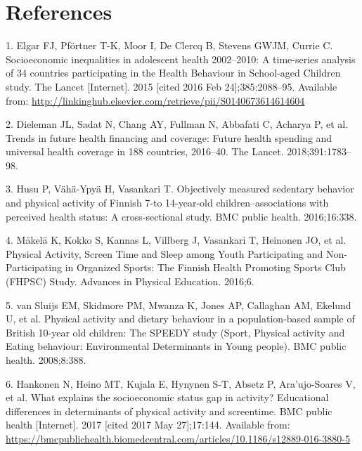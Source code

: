 \documentclass[english,man,floatsintext]{apa6}
\begin{document}
\newpage

\hypertarget{references}{%
\section{References}\label{references}}

\begingroup
\setlength{\parindent}{-0.5in}
\setlength{\leftskip}{0.5in}

\hypertarget{refs}{}
\leavevmode\hypertarget{ref-elgarSocioeconomicInequalitiesAdolescent2015}{}%
1. Elgar FJ, Pförtner T-K, Moor I, De Clercq B, Stevens GWJM, Currie C. Socioeconomic inequalities in adolescent health 2002--2010: A time-series analysis of 34 countries participating in the Health Behaviour in School-aged Children study. The Lancet {[}Internet{]}. 2015 {[}cited 2016 Feb 24{]};385:2088--95. Available from: \url{http://linkinghub.elsevier.com/retrieve/pii/S0140673614614604}

\leavevmode\hypertarget{ref-dielemanTrendsFutureHealth2018}{}%
2. Dieleman JL, Sadat N, Chang AY, Fullman N, Abbafati C, Acharya P, et al. Trends in future health financing and coverage: Future health spending and universal health coverage in 188 countries, 2016--40. The Lancet. 2018;391:1783--98.

\leavevmode\hypertarget{ref-husuObjectivelyMeasuredSedentary2016}{}%
3. Husu P, Vähä-Ypyä H, Vasankari T. Objectively measured sedentary behavior and physical activity of Finnish 7-to 14-year-old children--associations with perceived health status: A cross-sectional study. BMC public health. 2016;16:338.

\leavevmode\hypertarget{ref-makelaPhysicalActivityScreen2016}{}%
4. Mäkelä K, Kokko S, Kannas L, Villberg J, Vasankari T, Heinonen JO, et al. Physical Activity, Screen Time and Sleep among Youth Participating and Non-Participating in Organized Sports: The Finnish Health Promoting Sports Club (FHPSC) Study. Advances in Physical Education. 2016;6.

\leavevmode\hypertarget{ref-vansluijsPhysicalActivityDietary2008}{}%
5. van Sluijs EM, Skidmore PM, Mwanza K, Jones AP, Callaghan AM, Ekelund U, et al. Physical activity and dietary behaviour in a population-based sample of British 10-year old children: The SPEEDY study (Sport, Physical activity and Eating behaviour: Environmental Determinants in Young people). BMC public health. 2008;8:388.

\leavevmode\hypertarget{ref-hankonenWhatExplainsSocioeconomic2017}{}%
6. Hankonen N, Heino MT, Kujala E, Hynynen S-T, Absetz P, Ara\a'ujo-Soares V, et al. What explains the socioeconomic status gap in activity? Educational differences in determinants of physical activity and screentime. BMC public health {[}Internet{]}. 2017 {[}cited 2017 May 27{]};17:144. Available from: \url{https://bmcpublichealth.biomedcentral.com/articles/10.1186/s12889-016-3880-5}
\end{document}
